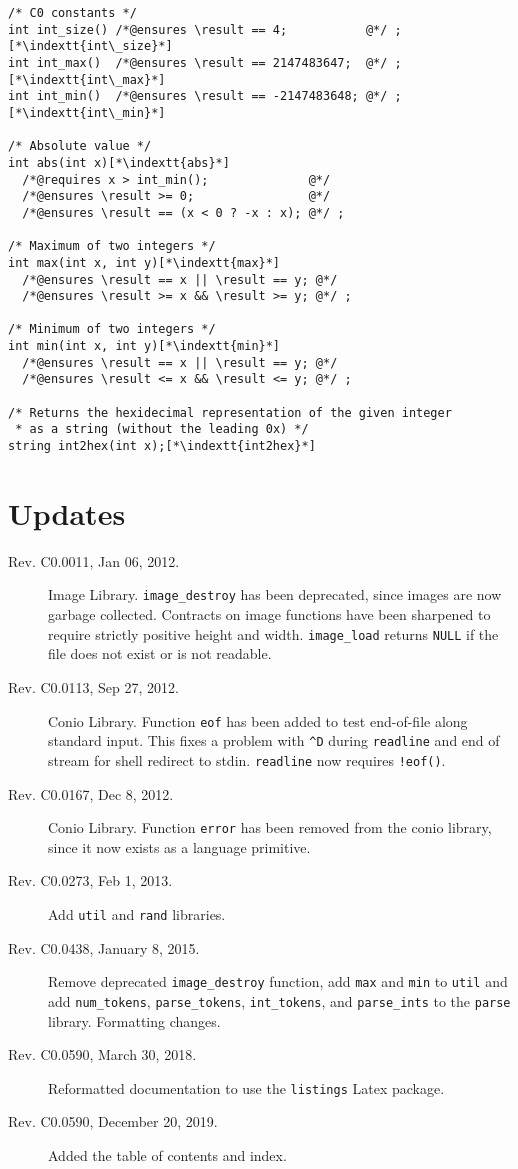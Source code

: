 \documentclass[11pt]{article}
\makeatletter
\renewcommand{\indexname}{List of C0 Library Functions}
\newcommand{\indextt}[1]{\index{#1@\texttt{#1}}}
\makeatother
\begin{document}
\begin{lstlisting}
/* C0 constants */
int int_size() /*@ensures \result == 4;           @*/ ;[*\indextt{int\_size}*]
int int_max()  /*@ensures \result == 2147483647;  @*/ ;[*\indextt{int\_max}*]
int int_min()  /*@ensures \result == -2147483648; @*/ ;[*\indextt{int\_min}*]

/* Absolute value */
int abs(int x)[*\indextt{abs}*]
  /*@requires x > int_min();              @*/
  /*@ensures \result >= 0;                @*/
  /*@ensures \result == (x < 0 ? -x : x); @*/ ;

/* Maximum of two integers */
int max(int x, int y)[*\indextt{max}*]
  /*@ensures \result == x || \result == y; @*/
  /*@ensures \result >= x && \result >= y; @*/ ;

/* Minimum of two integers */
int min(int x, int y)[*\indextt{min}*]
  /*@ensures \result == x || \result == y; @*/
  /*@ensures \result <= x && \result <= y; @*/ ;

/* Returns the hexidecimal representation of the given integer
 * as a string (without the leading 0x) */
string int2hex(int x);[*\indextt{int2hex}*]
\end{lstlisting}


\section{Updates}
\label{sec:updates}
\hypertarget{sec:updates}{}

\begin{description}
\item[Rev. C0.0011, Jan 06, 2012.]%
  Image Library.  \lstinline'image_destroy' has been deprecated, since
  images are now garbage collected.  Contracts on image functions have
  been sharpened to require strictly positive height and width.
  \lstinline'image_load' returns \lstinline'NULL' if the file does not
  exist or is not readable.
\item[Rev. C0.0113, Sep 27, 2012.]%
  Conio Library.  Function \lstinline'eof' has been added to test
  end-of-file along standard input.  This fixes a problem with
  \lstinline'^D' during \lstinline'readline' and end of stream for
  shell redirect to stdin.  \lstinline'readline' now requires
  \lstinline'!eof()'.
\item[Rev. C0.0167, Dec 8, 2012.]%
  Conio Library.  Function \lstinline'error' has been removed from the
  conio library, since it now exists as a language primitive.
\item[Rev. C0.0273, Feb 1, 2013.]%
  Add \lstinline'util' and \lstinline'rand' libraries.
\item[Rev. C0.0438, January 8, 2015.]%
  Remove deprecated \lstinline'image_destroy' function, add
  \lstinline'max' and \lstinline'min' to \lstinline'util' and add
  \lstinline'num_tokens', \lstinline'parse_tokens',
  \lstinline'int_tokens', and \lstinline'parse_ints' to the
  \lstinline'parse' library. Formatting changes.
\item[Rev. C0.0590, March 30, 2018.]%
  Reformatted documentation to use the \lstinline'listings' Latex
  package.
\item[Rev. C0.0590, December 20, 2019.]%
  Added the table of contents and  index.
\end{description}


\newpage
\addcontentsline{toc}{section}{\indexname}
\printindex
\end{document}
